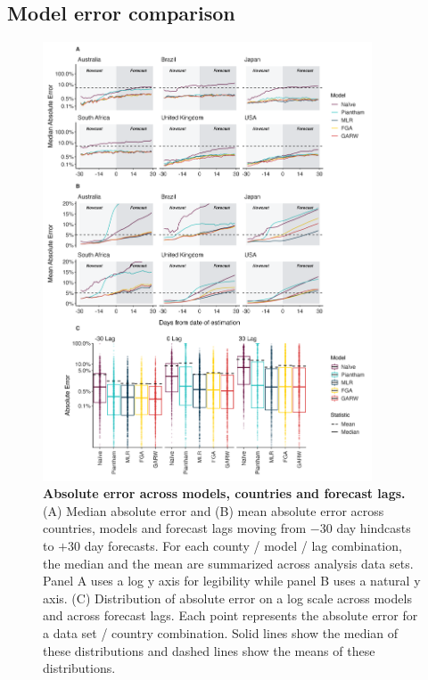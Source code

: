 \documentclass[11pt,oneside,letterpaper]{article}
\begin{document}
\subsection*{Model error comparison}

\begin{figure}[tb!]
	\centering
	\includegraphics[width=0.87\textwidth]{figures/model_comp.png}
	\caption{\textbf{Absolute error across models, countries and forecast lags.}
	(A) Median absolute error and (B) mean absolute error across countries, models and forecast lags moving from $-30$ day hindcasts to $+30$ day forecasts.
	For each county / model / lag combination, the median and the mean are summarized across analysis data sets.
	Panel A uses a log y axis for legibility while panel B uses a natural y axis.
	(C) Distribution of absolute error on a log scale across models and across forecast lags.
	Each point represents the absolute error for a data set / country combination.
	Solid lines show the median of these distributions and dashed lines show the means of these distributions.
	}
	\label{fig:model_comp_fig}
\end{figure}
\end{document}
